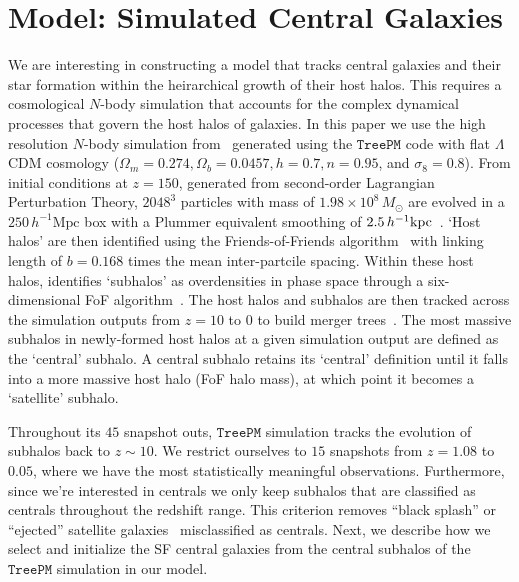 \documentclass[12pt, letterpaper, preprint, tighten]{aastex62}
\newcommand{\edt}[1]{{\color{dred}{\bf} #1}}
\begin{document}
\section{Model: Simulated Central Galaxies} \label{sec:sim}
\edt{We are} interesting in constructing a model that tracks central galaxies and 
their star formation within the heirarchical growth of their host halos. This 
requires a cosmological $N$-body simulation that accounts for the complex 
dynamical processes that govern the host halos of galaxies. In this paper 
we use the high resolution $N$-body simulation from~\cite{wetzel2013} generated 
using the \cite{white2002} $\mathtt{TreePM}$ code with flat $\Lambda$CDM cosmology 
($\Omega_m =0.274, \Omega_b = 0.0457, h = 0.7, n=0.95$, and $\sigma_8 = 0.8$).
From initial conditions at $z = 150$, generated from second-order Lagrangian 
Perturbation Theory, $2048^3$ particles with mass of $1.98 \times 10^8\,M_\odot$ are 
evolved in a \edt{$250\,h^{-1}\mathrm{Mpc}$} box with a Plummer equivalent smoothing of 
\edt{$2.5\,h^{-1}{\rm kpc}$}~\citep{wetzel2013, wetzel2014}. `Host halos' are then 
identified using the Friends-of-Friends algorithm~\citep[FoF;][]{davis1985} with 
linking length of $b{=}0.168$ times the mean inter-partcile spacing. Within 
these host halos, \cite{wetzel2013} identifies `subhalos' as overdensities 
in phase space through a six-dimensional FoF algorithm~\citep[FoF6D;][]{white2010}. 
The host halos and subhalos are then tracked across the simulation outputs 
from $z = 10$ to $0$ to build merger trees~\citep{wetzel2009,wetzel2010}. 
The most massive subhalos in newly-formed host halos at a given simulation 
output are defined as the `central' subhalo. A central subhalo retains its 
`central' definition until it falls into a more massive host halo 
\edt{(FoF halo mass)}, at which point it becomes a `satellite' subhalo. 

Throughout its $45$ snapshot outs, $\mathtt{TreePM}$ simulation tracks 
the evolution of subhalos back to $z \sim 10$. We restrict ourselves to $15$ 
snapshots from $z = 1.08$ to $0.05$, where we have the most statistically 
meaningful observations. Furthermore, since we're interested in centrals we only 
keep subhalos that are classified as centrals throughout the redshift 
range. This criterion removes ``black splash'' or ``ejected'' satellite 
galaxies~\citep[\emph{e.g.}][]{mamon2004,wetzel2014} misclassified as 
centrals. Next, we describe how we select and initialize the SF central
galaxies from the central subhalos of the $\mathtt{TreePM}$ 
simulation in our model.
\end{document}
